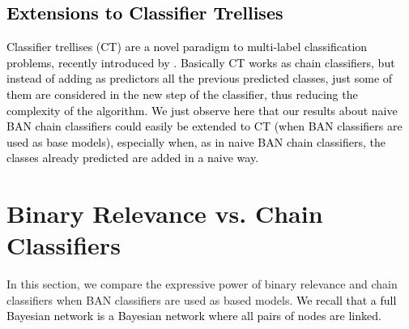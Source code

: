 \documentclass[11pt,a4paper, twoside]{book}
\begin{document}
\textcolor{black}{
\subsection{Extensions to Classifier Trellises}
Classifier trellises (CT) are a novel paradigm to multi-label classification problems, recently introduced by \cite{Read2015}. Basically CT works as chain classifiers, but instead of adding as predictors all the previous predicted classes, just some of them are considered in the new step of the classifier, thus reducing the complexity of the algorithm.
We just observe here that our results about naive BAN chain classifiers could easily be extended to CT (when BAN classifiers are used as base models), especially when, as in naive BAN chain classifiers, the classes already predicted are added in a naive way.
}

\section{Binary Relevance vs. Chain Classifiers}
\label{sec:comparis}

In this section, we compare the expressive power of binary relevance and chain classifiers when BAN classifiers are used as based models. 
\textcolor{black}{We recall that a full Bayesian network is a Bayesian network where all pairs of nodes are linked.}
\end{document}
